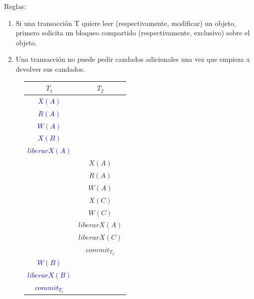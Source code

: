 \documentclass{templateNote}
\begin{document}
\begin{itemize}
\begin{itemize}
        Reglas:
        \begin{enumerate}
            \item Si una transacción T quiere leer (respectivamente, modificar) un objeto, primero solicita un bloqueo compartido (respectivamente, exclusivo) sobre el objeto.
            
            \item Una transacción no puede pedir candados adicionales una vez que empieza a devolver sus candados.
        \end{enumerate}

        \begin{figure}[H]
            \centering
            \begin{tabular}{|c|c|}
                \hline
                \textbf{$T_1$} & \textbf{$T_2$} \\ \hline
                \textcolor{blue}{$X(A)$} & \\
                \textcolor{blue}{$R(A)$} & \\
                \textcolor{blue}{$W(A)$} & \\
                \textcolor{blue}{$X(B)$} & \\
                \textcolor{blue}{\textit{$liberar{X(A)}$}} & \\
                & \textcolor{green!80!black}{$X(A)$} \\
                & \textcolor{green!80!black}{$R(A)$} \\
                & \textcolor{green!80!black}{$W(A)$} \\
                & \textcolor{green!80!black}{$X(C)$} \\
                & \textcolor{green!80!black}{$W(C)$} \\
                & \textcolor{green!80!black}{\textit{$liberar{X(A)}$}} \\
                & \textcolor{green!80!black}{\textit{$liberar{X(C)}$}} \\
                & \textcolor{green!80!black}{\textit{$commit_{T_2}$}} \\ \hline
                \textcolor{blue}{$W(B)$} & \\
                \textcolor{blue}{\textit{$liberar{X(B)}$}} & \\
                \textcolor{blue}{\textit{$commit_{T_1}$}} & \\ \hline
            \end{tabular}
        \end{figure}
    \end{itemize}


\end{itemize}
\end{document}
